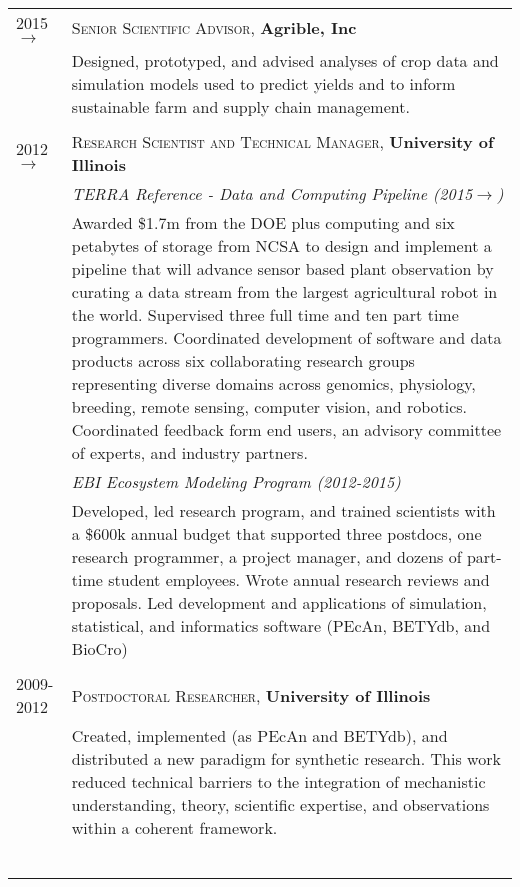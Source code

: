 \documentclass[a4paper,10pt]{article}
\begin{document}
\begin{tabular}{lp{11cm}}

2015$\rightarrow$ & \textsc{Senior Scientific Advisor}, \textbf{Agrible, Inc}\\
& \footnotesize{Designed, prototyped, and advised analyses of crop data and simulation models used to predict yields and to inform sustainable farm and supply chain management. }\\
\multicolumn{2}{c}{} \\

2012$\rightarrow$ & \textsc{Research Scientist and Technical Manager},  \textbf{University of Illinois} \\
& \small \emph{TERRA Reference - Data and Computing Pipeline (2015$\rightarrow$)}\\
&\footnotesize{Awarded \$1.7m from the DOE plus computing and six petabytes of storage from NCSA to design and implement a pipeline that will advance sensor based plant observation by curating a data stream from the largest agricultural robot in the world. Supervised three full time and ten part time programmers. Coordinated development of software and data products across six collaborating research groups representing diverse domains across genomics, physiology, breeding, remote sensing, computer vision, and robotics. Coordinated feedback form end users, an advisory committee of experts, and industry partners.
}\\
 & \emph{EBI Ecosystem Modeling Program (2012-2015)}\\
& \footnotesize{Developed, led research program, and trained scientists with a \$600k annual budget that supported three postdocs, one research programmer, a project manager, and dozens of part-time student employees. Wrote annual research reviews and proposals. Led development and applications of simulation, statistical, and informatics software (PEcAn, BETYdb, and BioCro)}\\
\multicolumn{2}{c}{} \\
2009-2012 & \textsc{Postdoctoral Researcher}, \textbf{University of Illinois}\\
& \footnotesize{Created, implemented (as PEcAn and BETYdb), and distributed a new paradigm for synthetic research. This work reduced technical barriers to the integration of mechanistic understanding, theory, scientific expertise, and observations within a coherent framework.}\\\
\textsc{} & \\
\multicolumn{2}{c}{} \\


\end{tabular}
\end{document}
